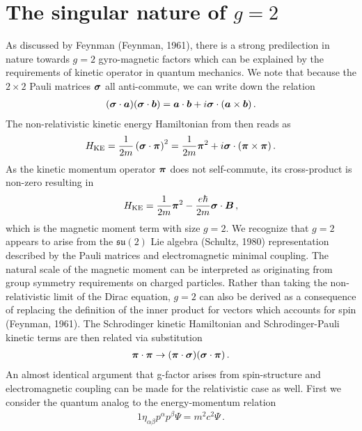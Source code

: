 \section{The singular nature of $g=2$}
\label{sec:nat}
As discussed by Feynman (Feynman, 1961), there is a strong predilection in nature towards $g=2$ gyro-magnetic factors which can be explained by the requirements of kinetic operator in quantum mechanics. We note that because the $2\times2$ Pauli matrices $\boldsymbol{\sigma}$ all anti-commute, we can write down the relation
\begin{alignat}{1}
	\label{nat:1} (\boldsymbol{\sigma}\cdot\boldsymbol{a})(\boldsymbol{\sigma}\cdot\boldsymbol{b})=\boldsymbol{a}\cdot\boldsymbol{b}+i\boldsymbol{\sigma}\cdot(\boldsymbol{a}\times\boldsymbol{b})\,.
\end{alignat}
The non-relativistic kinetic energy Hamiltonian from  then reads as
\begin{alignat}{1}
	\label{nat:2} {H}_{\mathrm{KE}}=\frac{1}{2m}\left(\boldsymbol{\sigma}\cdot\boldsymbol{\pi}\right)^{2}=\frac{1}{2m}\boldsymbol{\pi}^{2}+i\boldsymbol{\sigma}\cdot(\boldsymbol{\pi}\times\boldsymbol{\pi})\,.
\end{alignat}
As the kinetic momentum operator $\boldsymbol{\pi}$ does not self-commute, its cross-product is non-zero resulting in
\begin{alignat}{1}
	\label{nat:3} {H}_{\mathrm{KE}}=\frac{1}{2m}\boldsymbol{\pi}^{2}-\frac{e\hbar}{2m}\boldsymbol{\sigma}\cdot\boldsymbol{B}\,,
\end{alignat}
which is the magnetic moment term with size $g=2$. We recognize that $g=2$ appears to arise from the $\mathfrak{su}(2)$ Lie algebra (Schultz, 1980) representation described by the Pauli matrices and electromagnetic minimal coupling. The natural scale of the magnetic moment can be interpreted as originating from group symmetry requirements on charged particles. Rather than taking the non-relativistic limit of the Dirac equation, $g=2$ can also be derived as a consequence of replacing the definition of the inner product for vectors which accounts for spin (Feynman, 1961). The Schrodinger kinetic Hamiltonian and Schrodinger-Pauli kinetic terms are then related via substitution
\begin{alignat}{1}
	\label{nat:4} \boldsymbol{\pi}\cdot\boldsymbol{\pi} \rightarrow (\boldsymbol{\pi}\cdot\boldsymbol{\sigma})(\boldsymbol{\sigma}\cdot\boldsymbol{\pi})\,.
\end{alignat}
An almost identical argument that g-factor arises from spin-structure and electromagnetic coupling can be made for the relativistic case as well. First we consider the quantum analog to the energy-momentum relation
\begin{alignat}{1}
	\label{analog:1} \eta_{\alpha\beta}p^{\alpha}p^{\beta}\Psi=m^{2}c^{2}\Psi\,.
\end{alignat}
